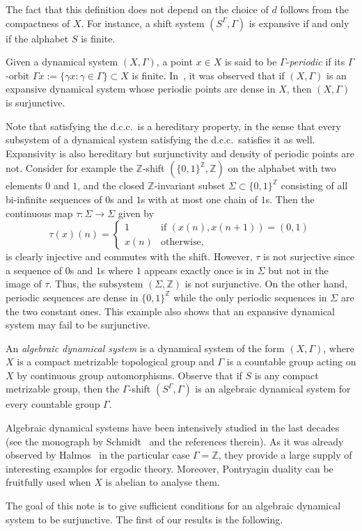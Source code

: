 \documentclass[12pt,a4paper]{amsart}
\theoremstyle{definition}
\numberwithin{equation}{section}
\begin{document}
The fact that this  definition does not depend on the choice of $d$
follows from the  compactness of $X$.
For instance, a shift system $(S^\Gamma,\Gamma)$ is expansive if and only if the alphabet $S$ is finite.
\par
Given a dynamical system $(X,\Gamma)$, a point $x \in X$ is said to be $\Gamma$-\emph{periodic}
if its $\Gamma$-orbit $\Gamma x :=  \{\gamma x : \gamma \in \Gamma\} \subset X$ is finite.
In~\cite[Proposition~5.1]{csc-ijm-2015}, it was observed that if $(X,\Gamma)$ is an expansive dynamical system whose periodic points are dense in  $X$,  then $(X,\Gamma)$ is surjunctive.
\par
Note that satisfying the d.c.c.\  is a hereditary property, in the sense that every subsystem of a  dynamical system satisfying the d.c.c.\ 
satisfies it as well. Expansivity is also hereditary 
but surjunctivity and density of periodic points are not. 
Consider for example the ${\mathbb{Z}}$-shift $(\{0,1\}^{\mathbb{Z}},{\mathbb{Z}})$
on the alphabet with two elements $0$ and $1$, 
and the  closed ${\mathbb{Z}}$-invariant subset  $\Sigma \subset \{0,1\}^{\mathbb{Z}}$ consisting of 
all bi-infinite sequences of $0$s and $1$s  with at most one chain of $1$s.
Then the continuous map $\tau \colon \Sigma \to \Sigma$ given by
$$
\tau(x)(n) =
\begin{cases}
1 & \text{if } (x(n),x(n+1)) = (0,1) \\
x(n) & \text{otherwise},
\end{cases}   
$$
is clearly  injective and commutes with the shift.
However, $\tau$ is not surjective since
a sequence of $0$s and $1$s where $1$ appears exactly once is in $\Sigma$ but not in the image 
of $\tau$.
Thus, the subsystem $(\Sigma,{\mathbb{Z}})$ is not surjunctive.
On the other hand, 
periodic sequences are dense in $\{0,1\}^{\mathbb{Z}}$
while the only periodic sequences in $\Sigma$ are the two constant ones.
This example also shows that an expansive dynamical system may fail to be surjunctive.
\par
An \emph{algebraic dynamical system}
is a dynamical system of the form $(X, \Gamma)$, where $X$ is a compact metrizable topological group and $\Gamma$ is a countable group acting on $X$  by continuous group automorphisms.
Observe that if $S$ is any compact metrizable group, then the $\Gamma$-shift $(S^\Gamma,\Gamma)$ is an algebraic dynamical system for every countable group $\Gamma$. 
\par
Algebraic dynamical systems have been intensively studied in the last decades
(see the monograph by Schmidt~\cite{schmidt-book} and the references therein). As it was already observed by Halmos~\cite{halmos}  in the particular case $\Gamma = {\mathbb{Z}}$,
they provide a large supply of interesting examples for ergodic theory.
Moreover, Pontryagin duality can be fruitfully used when $X$ is abelian to analyse them.
\par
The goal of this note is to give sufficient conditions for an algebraic dynamical system to be surjunctive. 
 The first of our  results is the following.
\end{document}
